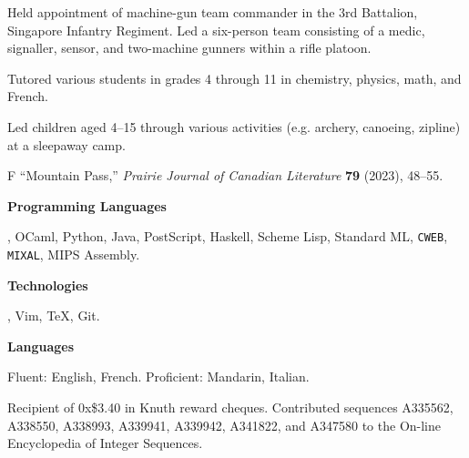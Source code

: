 \smallskip
Held appointment of machine-gun team commander in the 3rd Battalion, Singapore Infantry Regiment.
Led a six-person team consisting of a medic, signaller, sensor, and two-machine gunners within a rifle platoon.
\medbreak

\smallskip
Tutored various students in grades 4 through 11 in chemistry, physics, math, and French.
\medbreak

\smallskip
Led children aged 4--15 through various activities (e.g. archery, canoeing, zipline) at a sleepaway camp.
\medbreak


\begingroup\frenchspacing
{}
\pubbegin F
\ficitem ``Mountain Pass,'' {\sl Prairie Journal of Canadian Literature} {\bf 79} (2023), 48--55.
\endgroup%



{\bf Programming Languages}\par
\CEE, OCaml, Python, Java, PostScript, Haskell, Scheme Lisp,  Standard ML, {\tt CWEB}, {\tt MIXAL}, MIPS Assembly.
\medbreak

{\bf Technologies}\par
\UNIX, Vim, \TeX, Git.
\medbreak

{\bf Languages}\par
Fluent: English, French. Proficient: Mandarin, Italian.
\medbreak


\parindent=10pt
\thing Recipient of 0x\$3.40 in Knuth reward cheques.
\smallskip
\thing Contributed sequences A335562, A338550, A338993, A339941, A339942, A341822, and A347580
to the On-line Encyclopedia of Integer Sequences.
\medbreak

\filbreak

\bye

